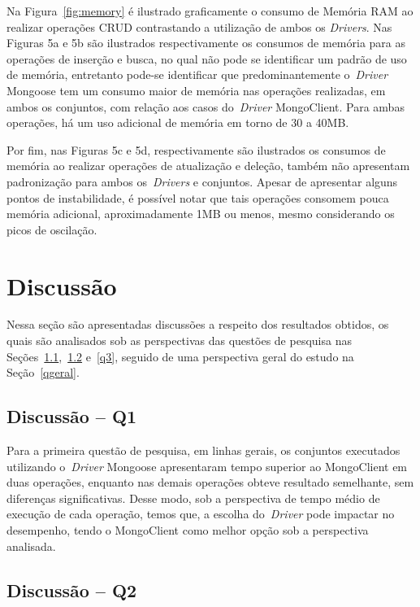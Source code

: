 \documentclass[12pt]{article}
\begin{document}
Na Figura~\ref{fig:memory} é ilustrado graficamente o consumo de Memória RAM ao realizar operações CRUD contrastando a utilização de ambos os \emph{Drivers}.
Nas Figuras 5a e 5b são ilustrados respectivamente os consumos de memória para as operações de inserção e busca, no qual não pode se identificar um padrão de uso de memória, entretanto pode-se identificar que predominantemente o~\emph{Driver} Mongoose tem um consumo maior de memória nas operações realizadas, em ambos os conjuntos, com relação aos casos do~\emph{Driver} MongoClient.
Para ambas operações, há um uso adicional de memória em torno de 30 a 40MB.

Por fim, nas Figuras 5c e 5d, respectivamente são ilustrados os consumos de memória ao realizar operações de atualização e deleção, também não apresentam padronização para ambos os~\emph{Drivers} e conjuntos. 
Apesar de apresentar alguns pontos de instabilidade, é possível notar que tais operações consomem pouca memória adicional, aproximadamente 1MB ou menos, mesmo considerando os picos de oscilação.

\section{Discussão}
\label{section:discussao}

Nessa seção são apresentadas discussões a respeito dos resultados obtidos, os quais são analisados sob as perspectivas das questões de pesquisa nas Seções~\ref{q1},~\ref{q2} e~\ref{q3}, seguido de uma perspectiva geral do estudo na Seção~\ref{qgeral}.

\subsection{Discussão -- Q1}
\label{q1}

Para a primeira questão de pesquisa, em linhas gerais, os conjuntos executados utilizando o~\emph{Driver} Mongoose apresentaram tempo superior ao MongoClient em duas operações, enquanto nas demais operações obteve resultado semelhante, sem diferenças significativas.
Desse modo, sob a perspectiva de tempo médio de execução de cada operação, temos que, a escolha do~\emph{Driver} pode impactar no desempenho, tendo o MongoClient como melhor opção sob a perspectiva analisada.

\subsection{Discussão -- Q2}
\label{q2}
\end{document}
